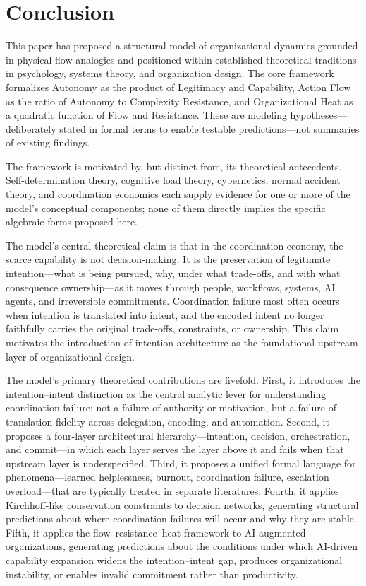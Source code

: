 \documentclass[12pt]{article}
\begin{document}
\section{Conclusion}

This paper has proposed a structural model of organizational dynamics
grounded in physical flow analogies and positioned within established
theoretical traditions in psychology, systems theory, and organization
design. The core framework formalizes Autonomy as the product of Legitimacy
and Capability, Action Flow as the ratio of Autonomy to Complexity
Resistance, and Organizational Heat as a quadratic function of Flow and
Resistance. These are modeling hypotheses---deliberately stated in formal
terms to enable testable predictions---not summaries of existing findings.

The framework is motivated by, but distinct from, its theoretical antecedents.
Self-determination theory, cognitive load theory, cybernetics, normal accident
theory, and coordination economics each supply evidence for one or more of
the model's conceptual components; none of them directly implies the specific
algebraic forms proposed here.

The model's central theoretical claim is that in the coordination economy,
the scarce capability is not decision-making. It is the preservation of
legitimate intention---what is being pursued, why, under what trade-offs, and
with what consequence ownership---as it moves through people, workflows,
systems, AI agents, and irreversible commitments. Coordination failure most
often occurs when intention is translated into intent, and the encoded intent
no longer faithfully carries the original trade-offs, constraints, or
ownership. This claim motivates the introduction of intention architecture
as the foundational upstream layer of organizational design.

The model's primary theoretical contributions are fivefold. First, it
introduces the intention--intent distinction as the central analytic lever
for understanding coordination failure: not a failure of authority or
motivation, but a failure of translation fidelity across delegation,
encoding, and automation. Second, it proposes a four-layer architectural
hierarchy---intention, decision, orchestration, and commit---in which each
layer serves the layer above it and fails when that upstream layer is
underspecified. Third, it proposes a unified formal language for
phenomena---learned helplessness, burnout, coordination failure, escalation
overload---that are typically treated in separate literatures. Fourth, it
applies Kirchhoff-like conservation constraints to decision networks,
generating structural predictions about where coordination failures will
occur and why they are stable. Fifth, it applies the flow--resistance--heat
framework to AI-augmented organizations, generating predictions about the
conditions under which AI-driven capability expansion widens the
intention--intent gap, produces organizational instability, or enables
invalid commitment rather than productivity.
\end{document}
